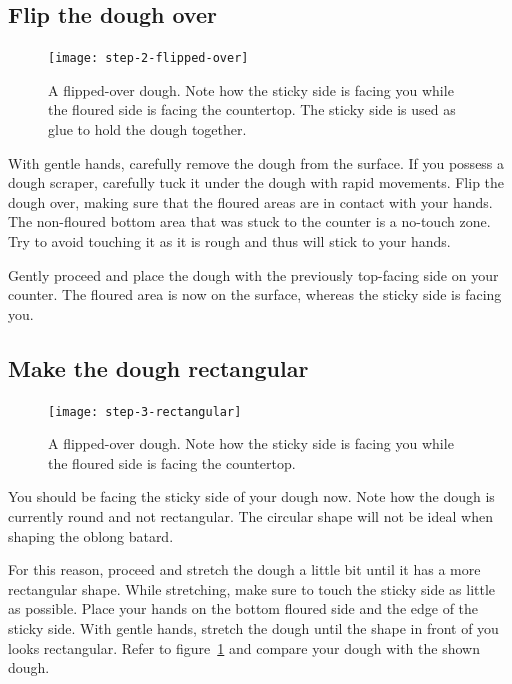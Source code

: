\subsection[Flipping the dough]{Flip the dough over}

\begin{figure}[!htb]
  \texttt{[image: step-2-flipped-over]}
  \caption[Step 2 of shaping process]{A flipped-over dough. Note how the
      sticky side is facing you while the floured side is facing the
      countertop.  The sticky side is used as glue to hold the dough together.}
\end{figure}

With gentle hands, carefully remove the dough from the surface. If
you possess a dough scraper, carefully tuck it under the dough with
rapid movements. Flip the dough over, making sure that the floured
areas are in contact with your hands. The non-floured bottom area that was
stuck to the counter is a no-touch zone. Try to avoid touching it
as it is rough and thus will stick to your hands.

Gently proceed and place the dough with the previously top-facing side
on your counter. The floured area is now on the surface, whereas the
sticky side is facing you.

\subsection[Create rectangular shape]{Make the dough rectangular}

\begin{figure}[htb!]
  \texttt{[image: step-3-rectangular]}
  \caption[Step 3 of shaping process]{A flipped-over dough. Note how the
      sticky side is facing you while the floured side is facing the
      countertop.}%
  \label{fig:shaping-rectangular-dough}
\end{figure}

You should be facing the sticky side of your dough now. Note how
the dough is currently round and not rectangular. The circular
shape will not be ideal when shaping the oblong batard.

For this reason, proceed and stretch the dough a little bit until
it has a more rectangular shape. While stretching, make sure to touch
the sticky side as little as possible. Place your hands on the bottom
floured side and the edge of the sticky side. With gentle hands,
stretch the dough until the shape in front of you looks rectangular.
Refer to figure~\ref{fig:shaping-rectangular-dough} and compare
your dough with the shown dough.

